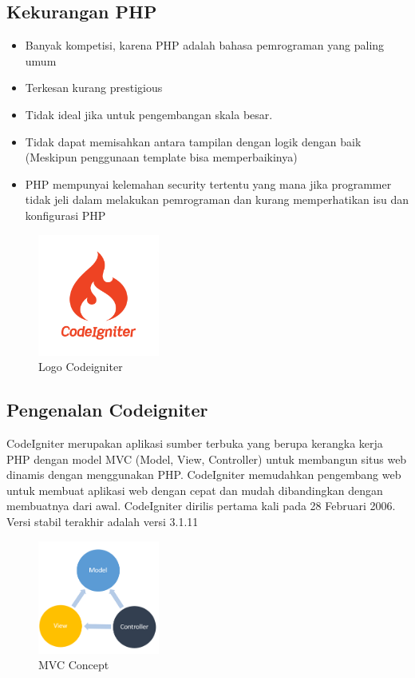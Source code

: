 \begin{enumerate}
\subsection{Kekurangan PHP}
\begin{itemize}
	\item Banyak kompetisi, karena PHP adalah bahasa pemrograman yang paling umum
	\item Terkesan kurang prestigious
	\item Tidak ideal jika untuk pengembangan skala besar.
	\item Tidak dapat memisahkan antara tampilan dengan logik dengan baik (Meskipun penggunaan template bisa memperbaikinya)
	\item PHP mempunyai kelemahan security tertentu yang mana jika programmer tidak jeli dalam melakukan pemrograman dan kurang memperhatikan isu dan konfigurasi PHP
\end{itemize}

	\begin{figure}[H]
		\includegraphics[width=4cm]{figures/web/logocodeigniter.png}
		\centering
		\caption{Logo Codeigniter}
	\end{figure}

\subsection{Pengenalan Codeigniter}

CodeIgniter merupakan aplikasi sumber terbuka yang berupa kerangka kerja PHP dengan model MVC (Model, View, Controller) untuk membangun situs web dinamis dengan menggunakan PHP. CodeIgniter memudahkan pengembang web untuk membuat aplikasi web dengan cepat dan mudah dibandingkan dengan membuatnya dari awal. CodeIgniter dirilis pertama kali pada 28 Februari 2006. Versi stabil terakhir adalah versi 3.1.11
	\begin{figure}[H]
		\includegraphics[width=4cm]{figures/web/mvc.png}
		\centering
		\caption{MVC Concept}
	\end{figure}

\end{enumerate}
